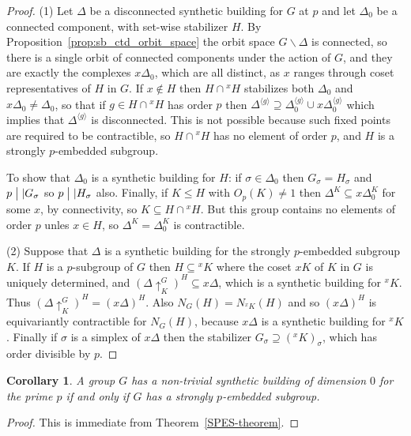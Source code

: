 \documentclass[12pt]{amsart}
\theoremstyle{plain}
\newtheorem{corollary}[theorem]{Corollary}
\theoremstyle{definition}
\theoremstyle{remark}
\numberwithin{equation}{section}
\begin{document}
\begin{proof}
    (1) Let $\Delta$ be a disconnected synthetic building for $G$ at $p$ and let $\Delta_0$ be a connected component, with set-wise stabilizer $H$. By Proposition~\ref{prop:sb_ctd_orbit_space} the orbit space $G\backslash \Delta$ is connected, so there is a single orbit of connected components under the action of $G$, and they are exactly the  complexes $x\Delta_0$, which are all distinct, as $x$ ranges through coset representatives of $H$ in $G$. If $x\not\in H$ then $H\cap{}^xH$ stabilizes both $\Delta_0$ and $x\Delta_0\ne\Delta_0$, so that if $g\in H\cap{}^xH$ has order $p$ then $\Delta^{\langle g\rangle}\supseteq \Delta_0^{\langle g\rangle} \cup x\Delta_0^{\langle g\rangle}$ which implies that $\Delta^{\langle g\rangle}$ is disconnected. This is not possible because such fixed points are required to be contractible, so $H\cap{}^xH$ has no element of order $p$, and $H$ is a strongly $p$-embedded subgroup.

    To show that $\Delta_0$ is a synthetic building for $H$: if $\sigma\in\Delta_0$ then $G_\sigma = H_\sigma$ and $p\bigm| |G_\sigma$ so $p\bigm| |H_\sigma$ also. Finally, if $K\le H$ with $O_p(K)\ne 1$ then $\Delta^K\subseteq x\Delta_0^K$ for some $x$, by connectivity, so $K\subseteq H\cap{}^xH$. But this group contains no elements of order $p$ unles $x\in H$, so $\Delta^K=\Delta_0^K$ is contractible.

    (2) Suppose that $\Delta$ is a synthetic building for the strongly $p$-embedded subgroup $K$. If $H$ is a $p$-subgroup of $G$ then $H\subseteq {}^xK$ where the coset $xK$ of $K$ in $G$ is uniquely determined, and $(\Delta\uparrow_K^G)^H\subseteq x\Delta$, which is a synthetic building for ${}^xK$. Thus $(\Delta\uparrow_K^G)^H= (x\Delta)^H$. Also $N_G(H) = N_{{}^xK}(H)$ and so $(x\Delta)^H$ is equivariantly contractible for $N_G(H)$, because $x\Delta$ is a synthetic building for ${}^xK$. Finally if $\sigma$ is a simplex of $x\Delta$ then the stabilizer $G_\sigma \supseteq ({}^xK)_\sigma$, which has order divisible by $p$.
\end{proof}

\begin{corollary}
\label{SPES-corollary}
    A group $G$ has a non-trivial synthetic building of dimension $0$ for the prime $p$ if and only if $G$ has a strongly $p$-embedded subgroup.
\end{corollary}

\begin{proof}
    This is immediate from Theorem~\ref{SPES-theorem}.
\end{proof}
\end{document}
